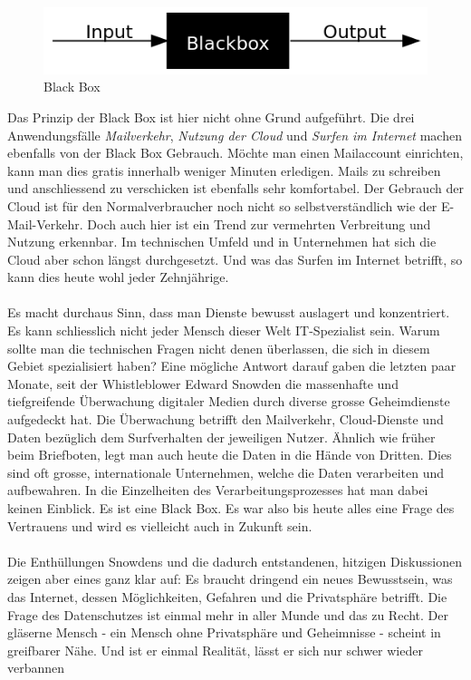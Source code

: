 \begin{figure}[H]
\centering
\includegraphics[scale=0.75]{images/BlackBox}
\caption{Black Box}
\end{figure}

Das Prinzip der Black Box ist hier nicht ohne Grund aufgeführt. Die drei Anwendungsfälle \textit{Mailverkehr}, \textit{Nutzung der Cloud} und \textit{Surfen im Internet} machen ebenfalls von der Black Box Gebrauch. Möchte man einen Mailaccount einrichten, kann man dies gratis innerhalb weniger Minuten erledigen. Mails zu schreiben und anschliessend zu verschicken ist ebenfalls sehr komfortabel. Der Gebrauch der Cloud ist für den Normalverbraucher noch nicht so selbstverständlich wie der E-Mail-Verkehr. Doch auch hier ist ein Trend zur vermehrten Verbreitung und Nutzung erkennbar. Im technischen Umfeld und in Unternehmen hat sich die Cloud aber schon längst durchgesetzt. Und was das Surfen im Internet betrifft, so kann dies heute wohl jeder Zehnjährige.
\\
\\
Es macht durchaus Sinn, dass man Dienste bewusst auslagert und konzentriert. Es kann schliesslich nicht jeder Mensch dieser Welt IT-Spezialist sein. Warum sollte man die technischen Fragen nicht denen überlassen, die sich in diesem Gebiet spezialisiert haben? Eine mögliche Antwort darauf gaben die letzten paar Monate, seit der Whistleblower Edward Snowden die massenhafte und tiefgreifende Überwachung digitaler Medien durch diverse grosse Geheimdienste aufgedeckt hat. Die Überwachung betrifft den Mailverkehr, Cloud-Dienste und Daten bezüglich dem Surfverhalten der jeweiligen Nutzer. Ähnlich wie früher beim Briefboten, legt man auch heute die Daten in die Hände von Dritten. Dies sind oft grosse, internationale Unternehmen, welche die Daten verarbeiten und aufbewahren. In die Einzelheiten des Verarbeitungsprozesses hat man dabei keinen Einblick. Es ist eine Black Box. Es war also bis heute alles eine Frage des Vertrauens und wird es vielleicht auch in Zukunft sein.
\\
\\
Die Enthüllungen Snowdens und die dadurch entstandenen, hitzigen Diskussionen zeigen aber eines ganz klar auf: Es braucht dringend ein neues Bewusstsein, was das Internet, dessen Möglichkeiten,  Gefahren und die Privatsphäre betrifft. Die Frage des Datenschutzes ist einmal mehr in aller Munde und das zu Recht. Der gläserne Mensch - ein Mensch ohne Privatsphäre und Geheimnisse - scheint in greifbarer Nähe. Und ist er einmal Realität, lässt er sich nur schwer wieder verbannen
